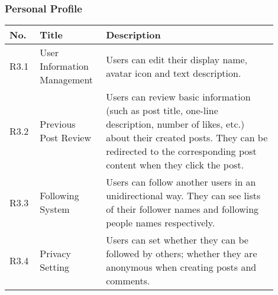 \documentclass[11pt, a4paper]{article}
\begin{document}
\smallskip

\subsubsection{Personal Profile}
\begin{tabular}{|>{\centering\arraybackslash}m{0.1\linewidth}|>{\centering\arraybackslash}m{0.2\linewidth}|m{0.6\linewidth}|} \hline
     No.&  Title&Description\\ \hline 
     R3.1&   User Information Management&Users can edit their display name, avatar icon and text description.\\ \hline 
     R3.2&   Previous Post Review&Users can review basic information (such as post title, one-line description, number of likes, etc.) about their created posts. They can be redirected to the corresponding post content when they click the post.\\ \hline 
     R3.3&   Following System&Users can follow another users in an unidirectional way. They can see lists of their follower names and following people names respectively.\\ \hline
     R3.4& Privacy Setting&Users can set whether they can be followed by others; whether they are anonymous when creating posts and comments.\\\hline
\end{tabular}

\smallskip
\end{document}
